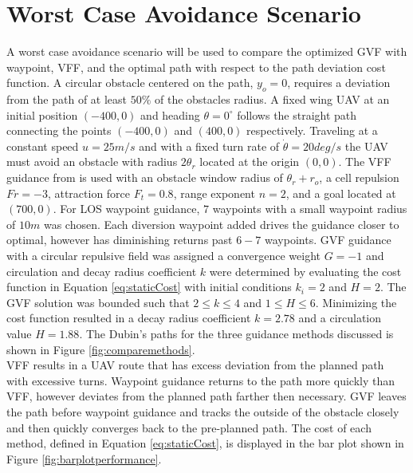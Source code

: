 \documentclass[numbered,pdftex]{ohio-etd}
\begin{document}
\section{Worst Case Avoidance Scenario}
A worst case avoidance scenario will be used to compare the optimized GVF with waypoint, VFF, and the optimal path with respect to the path deviation cost function. A circular obstacle centered on the path, $y_o = 0$, requires a deviation from the path of at least $50\% $ of the obstacles radius. A fixed wing UAV at an initial position $(-400,0)$ and heading $\theta=0^\circ$ follows the straight path connecting the points $(-400,0)$ and $(400,0)$ respectively. Traveling at a constant speed $u=25 m/s$ and with a fixed turn rate of $\dot{\theta}=20 deg/s$ the UAV must avoid an obstacle with radius $2\theta_r$ located at the origin $(0,0)$. The VFF guidance from \cite{borenstein_real-time_1990} is used with an obstacle window radius of $\theta_r+r_o$, a cell repulsion $Fr=-3$, attraction force $F_t=0.8$, range exponent $n=2$, and a goal located at $(700,0)$. For LOS waypoint guidance, $7$ waypoints with a small waypoint radius of $10m$ was chosen. Each diversion waypoint added drives the guidance closer to optimal, however has diminishing returns past $6-7$ waypoints. GVF guidance with a circular repulsive field was assigned a convergence weight $G=-1$ and circulation and decay radius coefficient $k$ were determined by evaluating the cost function in Equation \ref{eq:staticCost} with initial conditions $k_i = 2$ and $H=2$. The GVF solution was bounded such that $2\leq k\leq 4$ and $1\leq H\leq 6$.  Minimizing the cost function resulted in a decay radius coefficient $k=2.78$ and a circulation value $H=1.88$. The Dubin's paths for the three guidance methods discussed is shown in Figure \ref{fig:comparemethods}. \\

VFF results in a UAV route that has excess deviation from the planned path with excessive turns. Waypoint guidance returns to the path more quickly than VFF, however deviates from the planned path farther then necessary. GVF leaves the path before waypoint guidance and tracks the outside of the obstacle closely and then quickly converges back to the pre-planned path. The cost of each method, defined in Equation \ref{eq:staticCost}, is displayed in the bar plot shown in Figure \ref{fig:barplotperformance}.
\end{document}

